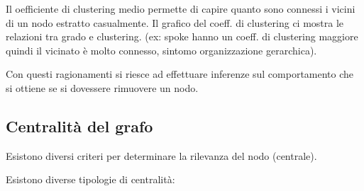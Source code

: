 Il oefficiente di clustering medio permette di capire quanto sono connessi i vicini
di un nodo estratto casualmente. Il grafico del coeff. di clustering ci mostra 
le relazioni tra grado e clustering. (ex: spoke hanno un coeff. di clustering maggiore 
quindi il vicinato è molto connesso, sintomo organizzazione gerarchica).  

Con questi ragionamenti si riesce ad effettuare inferenze sul comportamento che 
si ottiene se si dovessere rimuovere un nodo.

\subsection{Centralità del grafo}
Esistono diversi criteri per determinare la rilevanza del nodo (centrale). 

Esistono diverse tipologie di centralità:
